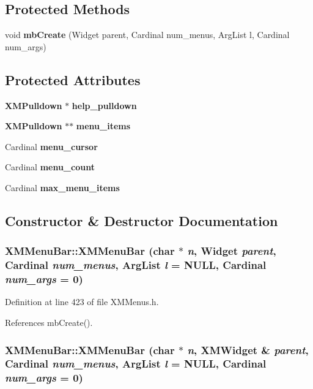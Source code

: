 \subsection*{Protected Methods}
\begin{CompactItemize}
\item 
void {\bf mb\-Create} (Widget parent, Cardinal num\_\-menus, Arg\-List l, Cardinal num\_\-args)
\end{CompactItemize}
\subsection*{Protected Attributes}
\begin{CompactItemize}
\item 
{\bf XMPulldown} $\ast$ {\bf help\_\-pulldown}
\item 
{\bf XMPulldown} $\ast$$\ast$ {\bf menu\_\-items}
\item 
Cardinal {\bf menu\_\-cursor}
\item 
Cardinal {\bf menu\_\-count}
\item 
Cardinal {\bf max\_\-menu\_\-items}
\end{CompactItemize}


\subsection{Constructor \& Destructor Documentation}
\subsubsection{\setlength{\rightskip}{0pt plus 5cm}XMMenu\-Bar::XMMenu\-Bar (char $\ast$ {\em n}, Widget {\em parent}, Cardinal {\em num\_\-menus}, Arg\-List {\em l} = NULL, Cardinal {\em num\_\-args} = 0)\hspace{0.3cm}{\tt  [inline]}}\label{classXMMenuBar_a0}




Definition at line 423 of file XMMenus.h.

References mb\-Create().
\subsubsection{\setlength{\rightskip}{0pt plus 5cm}XMMenu\-Bar::XMMenu\-Bar (char $\ast$ {\em n}, {\bf XMWidget} \& {\em parent}, Cardinal {\em num\_\-menus}, Arg\-List {\em l} = NULL, Cardinal {\em num\_\-args} = 0)\hspace{0.3cm}{\tt  [inline]}}\label{classXMMenuBar_a1}




